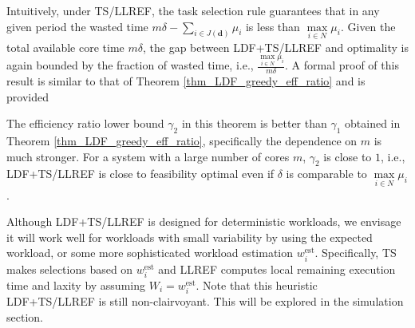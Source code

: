 \documentclass[prodmode,acmtompecs]{acmsmall}
\newcommand{\reqvec}{\mathbf{q}}
\newcommand{\fullUserSet}{N}
\newcommand{\myComments}[1]{}
\newif\ifinfocom
\newif\iftompecs
\newif\ifdissertation
\newcommand{\infocomStart}{\ifinfocom \myComments{Infocom: }}
\newcommand{\tompecsStart}{\iftompecs \myComments{TOMPECS version: }}
\newcommand{\dissertationStart}{\ifdissertation  \myComments{Dissertation version: }}
\newcommand{\commentEnd}{\myComments{End}}
\begin{document}
Intuitively, under TS/LLREF, the task selection rule guarantees that in any given period the wasted time $m\delta - \sum\limits_{i\in J(\mathbf{d})} \mu_i$ is less than $\max\limits_{i\in \fullUserSet} \mu_i$. Given the total available core time $m\delta$, the gap between LDF+TS/LLREF and optimality is again bounded by the fraction of wasted time, i.e.,  $\frac{\max\limits_{i \in \fullUserSet} \mu_i}{m\delta}$. A formal proof of this result is similar to that of Theorem \ref{thm_LDF_greedy_eff_ratio} and is provided 
\infocomStart
in the extended version of this paper \cite{EXT}. 
\commentEnd\fi
\tompecsStart
in Appendix \ref{appendix_pf_thm_LDF_TS_LLREF_eff_ratio}. 
\commentEnd\fi

The efficiency ratio lower bound $\gamma_2$ in this theorem is better than $\gamma_1$ obtained in Theorem \ref{thm_LDF_greedy_eff_ratio}, specifically the dependence on $m$ is much stronger. For a system with a large number of cores $m$, $\gamma_2$ is close to $1$, i.e., LDF+TS/LLREF is close to feasibility optimal even if $\delta$ is comparable to $\max\limits_{i\in \fullUserSet} \mu_i$. 

\dissertationStart
Under the more general NBUE (but not deterministic) workload assumption, if we somehow know the workload realizations at the beginning of each period, 
we can still adopt the LDF+TS/LLREF policy where the task selection is based on workload realizations. By similar proof as that for Theorem \ref{thm_LDF_TS_LLREF_eff_ratio} we can get the following corollary:
\begin{corollary}
For the SRT-MIC model with random NBUE workloads, if a QoS requirement vector $\reqvec$ can be fulfilled by some non-clairvoyant design, then under LDF+TS/LLREF which is clairvoyant $\gamma_2 \reqvec \in \text{cl}(F_{\text{LDF+TS/LLREF}})$, where
$$
\gamma_2 = 1 - \frac{\max\limits_{i \in \fullUserSet} \mu_i}{m\delta}. 
$$
\end{corollary}

In this corollary we are only comparing with non-clairvoyant designs, but note that in this scenario the LDF+TS/LLREF is a clairvoyant design because it requires knowledge of workload realizations, which can be hard in practice. 
\commentEnd\fi

Although LDF+TS/LLREF is designed for deterministic workloads, we envisage it will work well for workloads with small variability by using the expected workload, or some more sophisticated workload estimation $w_i^{\text{est}}$. Specifically, TS makes selections based on $w_i^{\text{est}}$ and LLREF computes local remaining execution time and laxity by assuming $W_i = w_i^{\text{est}}$. 
Note that this heuristic LDF+TS/LLREF is still non-clairvoyant. This will be explored in the simulation section. 
\end{document}
